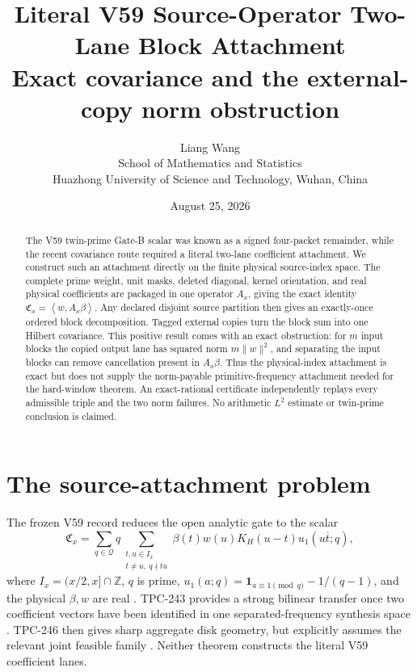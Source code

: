 \documentclass[11pt]{article}
\title{Literal V59 Source-Operator Two-Lane Block Attachment\\
\large Exact covariance and the external-copy norm obstruction}
\author{Liang Wang\\
School of Mathematics and Statistics\\
Huazhong University of Science and Technology, Wuhan, China}
\date{August 25, 2026}
\newcommand{\ip}[2]{\left\langle #1,#2\right\rangle}
\newcommand{\Cx}{\mathfrak C_x}
\begin{document}
\maketitle

\begin{abstract}
The V59 twin-prime Gate-B scalar was known as a signed four-packet remainder,
while the recent covariance route required a literal two-lane coefficient
attachment.  We construct such an attachment directly on the finite physical
source-index space.  The complete prime weight, unit masks, deleted diagonal,
kernel orientation, and real physical coefficients are packaged in one
operator $A_x$, giving the exact identity $\Cx=\ip{w}{A_x\beta}$.  Any
declared disjoint source partition then gives an exactly-once ordered block
decomposition.  Tagged external copies turn the block sum into one Hilbert
covariance.  This positive result comes with an exact obstruction: for $m$
input blocks the copied output lane has squared norm $m\|w\|^2$, and separating
the input blocks can remove cancellation present in $A_x\beta$.  Thus the
physical-index attachment is exact but does not supply the norm-payable
primitive-frequency attachment needed for the hard-window theorem.  An
exact-rational certificate independently replays every admissible triple and
the two norm failures.  No arithmetic $L^2$ estimate or twin-prime conclusion
is claimed.
\end{abstract}

\section{The source-attachment problem}

The frozen V59 record reduces the open analytic gate to the scalar
\begin{equation}
 \Cx=\sum_{q\in\mathcal Q}q
 \sum_{\substack{t,u\in I_x\\t\ne u,\ q\nmid tu}}
 \beta(t)w(u)K_H(u-t)u_1(u\overline t;q),                 \label{eq:v59}
\end{equation}
where $I_x=(x/2,x]\cap\mathbb Z$, $q$ is prime,
$u_1(a;q)=\mathbf 1_{a\equiv1\pmod q}-1/(q-1)$, and the
physical $\beta,w$ are real \cite{v59record}.  TPC-243 provides a strong
bilinear transfer once two coefficient vectors have been identified in one
separated-frequency synthesis space \cite{tpc243record}.  TPC-246 then gives
sharp aggregate disk geometry, but explicitly assumes the relevant joint
feasible family \cite{tpc246record}.  Neither theorem constructs the literal
V59 coefficient lanes.
\end{document}
